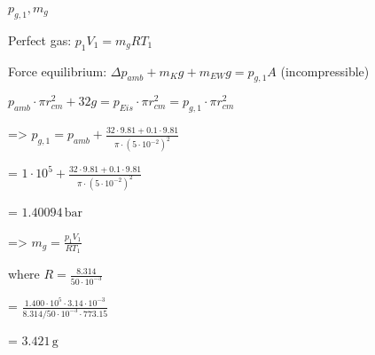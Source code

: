 \( p_{g,1}, m_g \)  

Perfect gas:  
\( p_1 V_1 = m_g R T_1 \)  

Force equilibrium:  
\( \Delta p_{amb} + m_K g + m_{EW} g = p_{g,1} A \) (incompressible)  

\( p_{amb} \cdot \pi r_{cm}^2 + 32 g = p_{Eis} \cdot \pi r_{cm}^2 = p_{g,1} \cdot \pi r_{cm}^2 \)  

=> \( p_{g,1} = p_{amb} + \frac{32 \cdot 9.81 + 0.1 \cdot 9.81}{\pi \cdot (5 \cdot 10^{-2})^2} \)  

= \( 1 \cdot 10^5 + \frac{32 \cdot 9.81 + 0.1 \cdot 9.81}{\pi \cdot (5 \cdot 10^{-2})^2} \)  

= \( 1.40094 \, \text{bar} \)  

=> \( m_g = \frac{p_1 V_1}{R T_1} \)  

where \( R = \frac{8.314}{50 \cdot 10^{-3}} \)  

= \( \frac{1.400 \cdot 10^5 \cdot 3.14 \cdot 10^{-3}}{8.314 / 50 \cdot 10^{-3} \cdot 773.15} \)  

= \( 3.421 \, \text{g} \)